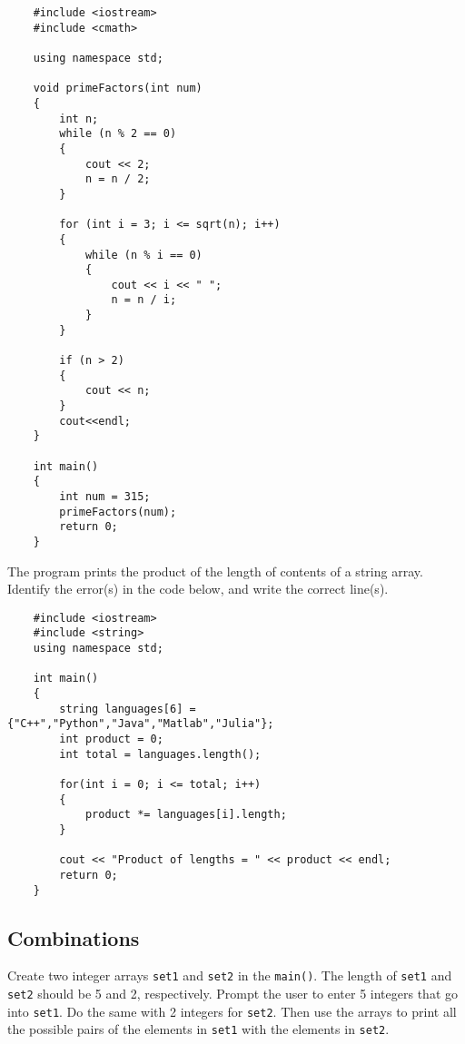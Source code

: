 \begin{verbatim}
    #include <iostream>
    #include <cmath>
    
    using namespace std; 
      
    void primeFactors(int num)
    { 
        int n;
        while (n % 2 == 0) 
        { 
            cout << 2; 
            n = n / 2; 
        } 
    
        for (int i = 3; i <= sqrt(n); i++)
        { 
            while (n % i == 0) 
            { 
                cout << i << " "; 
                n = n / i; 
            } 
        } 
      
        if (n > 2) 
        {
            cout << n; 
        }
        cout<<endl;
    } 
    
    int main() 
    { 
        int num = 315; 
        primeFactors(num); 
        return 0; 
    }
\end{verbatim}

\begin{multipart}
 The program prints the product of the length of contents of a string array. Identify the error(s) in the code below, and write the correct line(s).
\end{multipart}

\begin{verbatim}
    #include <iostream>
    #include <string>
    using namespace std;
    
    int main()
    {
        string languages[6] = {"C++","Python","Java","Matlab","Julia"};
        int product = 0;
        int total = languages.length();
    
        for(int i = 0; i <= total; i++)
        {
            product *= languages[i].length;
        }
    
        cout << "Product of lengths = " << product << endl;
        return 0;
    }
\end{verbatim}

\subsection{Combinations}

Create two integer arrays \texttt{set1} and \texttt{set2} in the \texttt{main()}. The length of \texttt{set1} and \texttt{set2} should be 5 and 2, respectively. Prompt the user to enter 5 integers that go into \texttt{set1}. Do the same with 2 integers for \texttt{set2}. Then use the arrays to print all the possible pairs of the elements in \texttt{set1} with the elements in \texttt{set2}.

